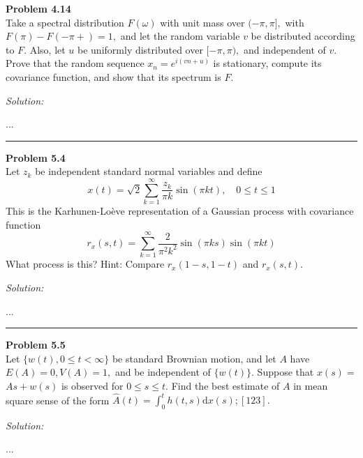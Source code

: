 \documentclass[a4paper, 11pt]{article}
\newenvironment{problem}[2][Problem]
    { \begin{mdframed}[backgroundcolor=gray!20] \textbf{#1 #2} \\}
    {  \end{mdframed}}
\newenvironment{solution}
    {\textit{Solution:}}
    {}
\begin{document}
\begin{problem}{4.14}
	Take a spectral distribution $F(\omega)$ with unit mass over $(-\pi, \pi],$ with $F(\pi)-F(-\pi+)=1,$ and let the random variable $v$ be distributed according to $F$. Also, let $u$ be uniformly distributed over $[-\pi, \pi),$ and independent of $v .$ Prove that the random sequence $x_{n}=e^{i(v n+u)}$ is stationary, compute its covariance function, and show that its spectrum is $F$.
\end{problem}
\begin{solution}
	
...
	
\end{solution} 

\noindent\rule{7in}{2.8pt}


\begin{problem}{5.4}
Let $z_{k}$ be independent standard normal variables and define
\[
x(t)=\sqrt{2} \sum_{k=1}^{\infty} \frac{z_{k}}{\pi k} \sin (\pi k t), \quad 0 \leq t \leq 1
\]
This is the Karhunen-Loève representation of a Gaussian process with covariance function
\[
r_{x}(s, t)=\sum_{k=1}^{\infty} \frac{2}{\pi^{2} k^{2}} \sin (\pi k s) \sin (\pi k t)
\]
What process is this? Hint: Compare $r_{x}(1-s, 1-t)$ and $r_{x}(s, t).$
\end{problem}
\begin{solution}
	
	...
	
\end{solution} 

\noindent\rule{7in}{2.8pt}


\begin{problem}{5.5}
	Let $\{w(t), 0 \leq t<\infty\}$ be standard Brownian motion, and let $A$ have $E(A)=0, V(A)=1,$ and be independent of $\{w(t)\} .$ Suppose that $x(s)=$ $A s+w(s)$ is observed for $0 \leq s \leq t$. Find the best estimate of $A$ in mean square sense of the form $\widehat{A}(t)=\int_{0}^{t} h(t, s) \mathrm{d} x(s) ;[123].$
\end{problem}
\begin{solution}
	
	...
	
\end{solution} 
\end{document}
